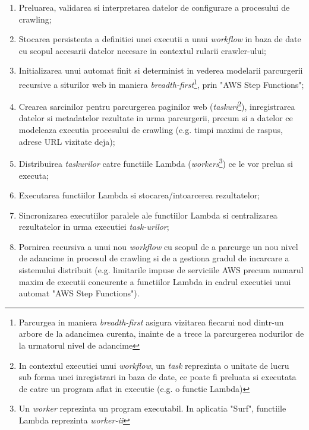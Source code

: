 \begin{enumerate}

	\item{Preluarea, validarea si interpretarea datelor de configurare a procesului de crawling;}
	
	\item{Stocarea persistenta a definitiei unei executii a unui \textit{workflow} in baza de date cu scopul accesarii datelor necesare in contextul rularii crawler-ului;}
	
	\item{Initializarea unui automat finit si determinist in vederea modelarii parcurgerii recursive a siturilor web in maniera \textit{breadth-first}\footnote{Parcurgea in maniera \textit{breadth-first} asigura vizitarea fiecarui nod dintr-un arbore de la adancimea curenta, inainte de a trece la parcurgerea nodurilor de la urmatorul nivel de adancime}, prin "AWS Step Functions";}
	
	\item{Crearea sarcinilor pentru parcurgerea paginilor web (\textit{taskuri}\footnote{In contextul executiei unui \textit{workflow}, un \textit{task} reprezinta o unitate de lucru sub forma unei inregistrari in baza de date, ce poate fi preluata si executata de catre un program aflat in executie (e.g. o functie Lambda)}), inregistrarea datelor si metadatelor rezultate in urma parcurgerii, precum si a datelor ce modeleaza executia procesului de crawling (e.g. timpi maximi de raspus, adrese URL vizitate deja);}
	
	\item{Distribuirea \textit{taskurilor} catre functiile Lambda (\textit{workers}\footnote{Un \textit{worker} reprezinta un program executabil. In aplicatia "Surf", functiile Lambda reprezinta \textit{worker-ii}}) ce le vor prelua si executa;}
	
	\item{Executarea functiilor Lambda si stocarea/intoarcerea rezultatelor;}
	
	\item{Sincronizarea executiilor paralele ale functiilor Lambda si centralizarea rezultatelor in urma executiei \textit{task-urilor};}
	
	\item{Pornirea recursiva a unui nou \textit{workflow} cu scopul de a parcurge un nou nivel de adancime in procesul de crawling si de a gestiona gradul de incarcare a sistemului distribuit (e.g. limitarile impuse de serviciile AWS precum numarul maxim de executii concurente a functiilor Lambda in cadrul executiei unui automat "AWS Step Functions").}
	
\end{enumerate} 

